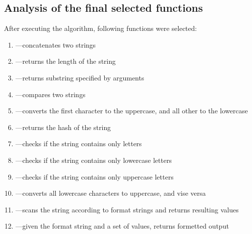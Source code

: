 \documentclass[11pt,nonacm,natbib=false]{acmart}
\begin{document}
\subsection{Analysis of the final selected functions}
After executing the algorithm, following functions were selected:
\begin{enumerate}
    \item {}---concatenates two strings
    \item {}---returns the length of the string
    \item {}---returns substring specified by arguments
    \item {}---compares two strings
    \item {}---converts the first character to the uppercase, and all other to the lowercase
    \item {}---returns the hash of the string
    \item {}---checks if the string contains only letters
    \item {}---checks if the string contains only lowercase letters
    \item {}---checks if the string contains only uppercase letters
    \item {}---converts all lowercase characters to uppercase, and vise versa
    \item {}---scans the string according to format strings and returns resulting values
    \item {}---given the format string and a set of values, returns formetted output
\end{enumerate}
\end{document}
